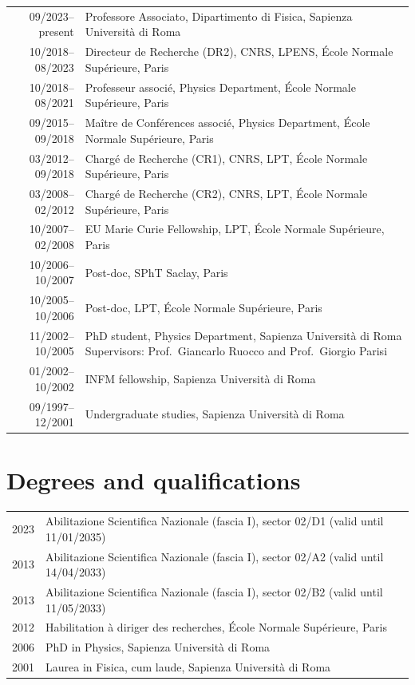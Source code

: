 \documentclass[a4paper,10pt]{article}
\begin{document}
\begin{tabularx}{\textwidth}{@{}D L@{}}
09/2023--present & Professore Associato, Dipartimento di Fisica, Sapienza Università di Roma \\
10/2018--08/2023 & Directeur de Recherche (DR2), CNRS, LPENS, École Normale Supérieure, Paris \\
10/2018--08/2021 & Professeur associé, Physics Department, École Normale Supérieure, Paris \\
09/2015--09/2018 & Maître de Conférences associé, Physics Department, École Normale Supérieure, Paris \\
03/2012--09/2018 & Chargé de Recherche (CR1), CNRS, LPT, École Normale Supérieure, Paris \\
03/2008--02/2012 & Chargé de Recherche (CR2), CNRS, LPT, École Normale Supérieure, Paris \\
10/2007--02/2008 & EU Marie Curie Fellowship, LPT, École Normale Supérieure, Paris \\
10/2006--10/2007 & Post-doc, SPhT Saclay, Paris \\
10/2005--10/2006 & Post-doc, LPT, École Normale Supérieure, Paris \\
11/2002--10/2005 & PhD student, Physics Department, Sapienza Università di Roma \newline
                     {\small Supervisors: Prof.~Giancarlo Ruocco and Prof.~Giorgio Parisi} \\
01/2002--10/2002 & INFM fellowship, Sapienza Università di Roma \\
09/1997--12/2001 & Undergraduate studies, Sapienza Università di Roma \\
\end{tabularx}

\section{Degrees and qualifications}

\begin{tabularx}{\textwidth}{@{}D L@{}}
2023 & Abilitazione Scientifica Nazionale (fascia I), sector 02/D1 (valid until 11/01/2035) \\
2013 & Abilitazione Scientifica Nazionale (fascia I), sector 02/A2 (valid until 14/04/2033) \\
2013 & Abilitazione Scientifica Nazionale (fascia I), sector 02/B2 (valid until 11/05/2033) \\
2012 & Habilitation à diriger des recherches, École Normale Supérieure, Paris \\
2006 & PhD in Physics, Sapienza Università di Roma \\
2001 & Laurea in Fisica, cum laude, Sapienza Università di Roma \\
\end{tabularx}
\end{document}
